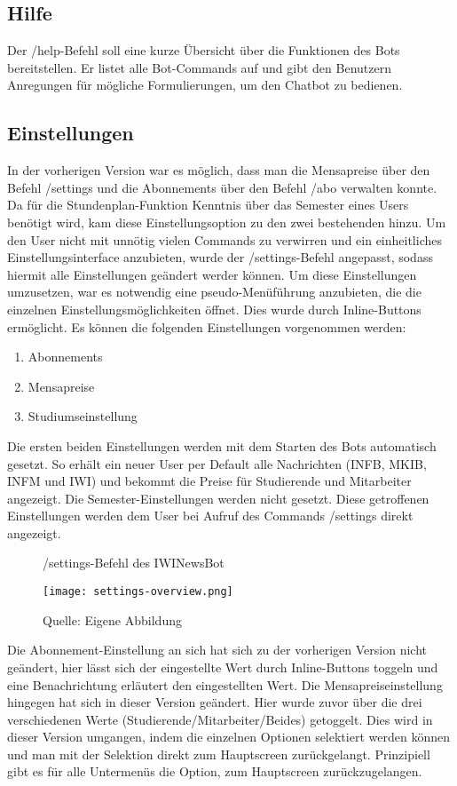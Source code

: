 \subsection{Hilfe}
Der /help-Befehl soll eine kurze Übersicht über die Funktionen des Bots bereitstellen. Er listet alle Bot-Commands auf und gibt den Benutzern Anregungen für mögliche Formulierungen, um den Chatbot zu bedienen.

\subsection{Einstellungen}
In der vorherigen Version war es möglich, dass man die Mensapreise über den Befehl /settings und die Abonnements über den Befehl /abo verwalten konnte. Da für die Stundenplan-Funktion Kenntnis über das Semester eines Users benötigt wird, kam diese Einstellungsoption zu den zwei bestehenden hinzu. Um den User nicht mit unnötig vielen Commands zu verwirren und ein einheitliches Einstellungsinterface anzubieten, wurde der /settings-Befehl angepasst, sodass hiermit alle Einstellungen geändert werder können.
Um diese Einstellungen umzusetzen, war es notwendig eine pseudo-Menüführung anzubieten, die die einzelnen Einstellungsmöglichkeiten öffnet. Dies wurde durch Inline-Buttons ermöglicht. Es können die folgenden Einstellungen vorgenommen werden:
\begin{enumerate}[noitemsep]
    \item Abonnements
    \item Mensapreise
    \item Studiumseinstellung
\end{enumerate}
Die ersten beiden Einstellungen werden mit dem Starten des Bots automatisch gesetzt. So erhält ein neuer User per Default alle Nachrichten (INFB, MKIB, INFM und IWI) und bekommt die Preise für Studierende und Mitarbeiter angezeigt. Die Semester-Einstellungen werden nicht gesetzt.
Diese getroffenen Einstellungen werden dem User bei Aufruf des Commands /settings direkt angezeigt.

\begin{figure}[H]
    \centering
    \caption{/settings-Befehl des IWINewsBot}
      \texttt{[image: settings-overview.png]}
      \label{img:settings}
    \caption*{Quelle: Eigene Abbildung}
\end{figure}

Die Abonnement-Einstellung an sich hat sich zu der vorherigen Version nicht geändert, hier lässt sich der eingestellte Wert durch Inline-Buttons toggeln und eine Benachrichtung erläutert den eingestellten Wert. Die Mensapreiseinstellung hingegen hat sich in dieser Version geändert. Hier wurde zuvor über die drei verschiedenen Werte (Studierende/Mitarbeiter/Beides) getoggelt. Dies wird in dieser Version umgangen, indem die einzelnen Optionen selektiert werden können und man mit der Selektion direkt zum Hauptscreen zurückgelangt. Prinzipiell gibt es für alle Untermenüs die Option, zum Hauptscreen zurückzugelangen.

